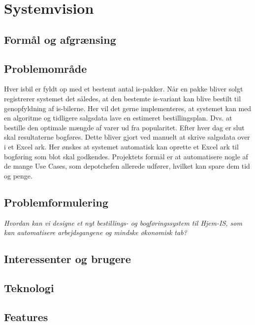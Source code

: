 \chapter{Systemvision}\label{ch:systemvision}

\section{Formål og afgrænsing}

\section{Problemområde}
Hver isbil er fyldt op med et bestemt antal is-pakker. Når en pakke bliver solgt registrerer systemet det således, at den bestemte is-variant kan blive bestilt til genopfyldning af is-bilerne. Her vil det gerne implementeres, at systemet kan med en algoritme og tidligere salgsdata lave en estimeret bestillingsplan. Dvs. at bestille den optimale mængde af varer ud fra popularitet. 
Efter hver dag er slut skal resultaterne bogføres. Dette bliver gjort ved manuelt at skrive salgsdata over i et Excel ark. Her ønskes at systemet automatisk kan oprette et Excel ark til bogføring som blot skal godkendes.
Projektets formål er at automatisere nogle af de mange Use Cases, som depotchefen allerede udfører, hvilket kan spare dem tid og penge.

\section{Problemformulering}
 \textit{Hvordan kan vi designe et nyt bestillings- og bogføringssystem til Hjem-IS, som kan automatisere arbejdsgangene og mindske økonomisk tab?} 

 \section{Interessenter og brugere}

 \section{Teknologi}

 \section{Features}
